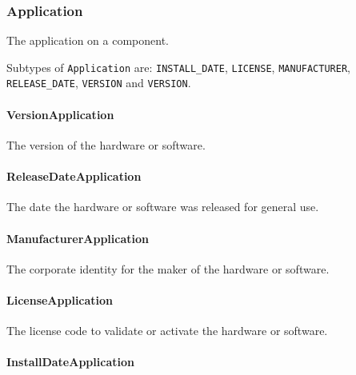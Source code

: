 \FloatBarrier

\subsubsection{Application}
\label{sec:Application}



The application on a component.



Subtypes of \texttt{Application} are: \texttt{INSTALL_DATE}, \texttt{LICENSE}, \texttt{MANUFACTURER}, \texttt{RELEASE_DATE}, \texttt{VERSION} and \texttt{VERSION}. 
\FloatBarrier

\paragraph{VersionApplication}\mbox{}
\label{sec:VersionApplication}



The version of the hardware or software.


\paragraph{ReleaseDateApplication}\mbox{}
\label{sec:ReleaseDateApplication}



The date the hardware or software was released for general use.



\paragraph{ManufacturerApplication}\mbox{}
\label{sec:ManufacturerApplication}



The corporate identity for the maker of the hardware or software.



\paragraph{LicenseApplication}\mbox{}
\label{sec:LicenseApplication}



The license code to validate or activate the hardware or software.


\paragraph{InstallDateApplication}\mbox{}
\label{sec:InstallDateApplication}



